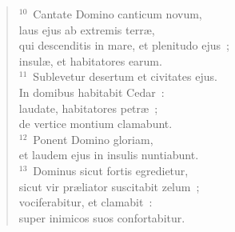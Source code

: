 \begin{verse}${}^{10}$~Cantate Domino canticum novum,\\ laus ejus ab extremis terr\ae ,\\ qui descenditis in mare, et plenitudo ejus~;\\ insul\ae , et habitatores earum.\\
${}^{11}$~Sublevetur desertum et civitates ejus.\\ In domibus habitabit Cedar~:\\ laudate, habitatores petr\ae~;\\ de vertice montium clamabunt.\\
${}^{12}$~Ponent Domino gloriam,\\ et laudem ejus in insulis nuntiabunt.\\
${}^{13}$~Dominus sicut fortis egredietur,\\ sicut vir pr\ae liator suscitabit zelum~;\\ vociferabitur, et clamabit~:\\ super inimicos suos confortabitur.\end{verse}


